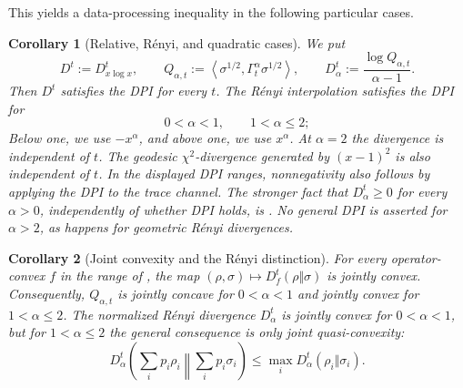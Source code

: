 \documentclass[11pt]{article}
\newtheorem{corollary}[corollary]{Corollary}
\theoremstyle{remark}
\newcommand{\1}{\mathbbm{1}}
\begin{document}
This yields a data-processing inequality in the following particular cases.

\begin{corollary}[Relative, R\'enyi, and quadratic cases]
\label{cor:consolidated-basic-examples}
We put
\begin{equation}
 D^t:=D_{x\log x}^t,\qquad
 Q_{\alpha,t}:=
 \left\langle\sigma^{1/2},\Gamma_t^\alpha
 \sigma^{1/2}\right\rangle,\qquad
 D_\alpha^t:=\frac{\log Q_{\alpha,t}}{\alpha-1}.
\end{equation}
Then $D^t$ satisfies the DPI for every $t$.  The R\'enyi
interpolation satisfies the DPI for
\begin{equation}
 0<\alpha<1,\qquad 1<\alpha\leq2;
\end{equation}
Below one, we use $-x^\alpha$, and above one, we use $x^\alpha$.
At $\alpha=2$ the divergence is independent of $t$.  The
geodesic $\chi^2$-divergence generated by $(x-1)^2$ is also
independent of $t$.  In the displayed DPI ranges, nonnegativity also
follows by applying the DPI to the trace channel.  The stronger fact
that $D_\alpha^t\geq0$ for every $\alpha>0$, independently of whether
DPI holds, is .
No general DPI is asserted for $\alpha>2$, as happens for geometric Rényi divergences.
\end{corollary}

\begin{corollary}[Joint convexity and the R\'enyi distinction]
\label{cor:consolidated-joint-convexity}
For every operator-convex $f$ in the range of
, the map
$(\rho,\sigma)\mapsto D_f^t(\rho\Vert\sigma)$ is jointly convex.
Consequently, $Q_{\alpha,t}$ is jointly concave for
$0<\alpha<1$ and jointly convex for $1<\alpha\leq2$.  The
normalized R\'enyi divergence $D_\alpha^t$ is jointly convex for
$0<\alpha<1$, but for $1<\alpha\leq2$ the general consequence is
only joint quasi-convexity:
\begin{equation}
 D_\alpha^t\!\left(\sum_i p_i\rho_i\middle\Vert
                         \sum_i p_i\sigma_i\right)
 \leq\max_i D_\alpha^t(\rho_i\Vert\sigma_i).
 \label{eq:consolidated-Renyi-quasiconvexity}
\end{equation}
\end{corollary}
\end{document}
